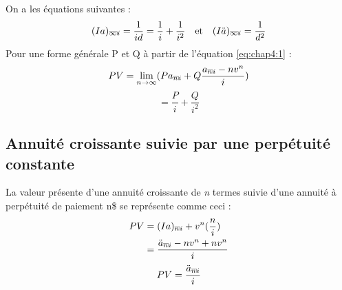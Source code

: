 \documentclass[11pt,french]{report}
\makeatletter
\DeclareRobustCommand{\annuity}[1]{%
\def\arraystretch{0}%
\setlength\arraycolsep{.7pt}%
\setlength\arrayrulewidth{.3pt}%
\begin{array}[b]{@{}c|}\hline
\\[\arraycolsep]%
\scriptstyle #1%
\end{array}%
}
\makeatother
\begin{document}
On a les équations suivantes :
\begin{equation}
(Ia)_{\annuity{\infty}i} = \frac{1}{id} = \frac{1}{i} + \frac{1}{i^2} \quad \text{et} \quad (I\ddot{a})_{\annuity{\infty}i} = \frac{1}{d^2}
\end{equation}
Pour une forme générale P et Q à partir de l'équation \ref{eq:chap4:1} :
\begin{align*}
PV = \lim\limits_{n \to \infty}( Pa_{\annuity{n}i} + Q \frac{a_{\annuity{n}i} - nv^{n}}{i})
\end{align*}
\begin{equation}
= \frac{P}{i} + \frac{Q}{i^2}
\end{equation}
\subsection{Annuité croissante suivie par une perpétuité constante}

La valeur présente d'une annuité croissante de \textit{n} termes suivie d'une annuité à perpétuité de paiement n\$ se représente comme ceci :
\begin{align*}
PV & = (Ia)_{\annuity{n}i} + v^{n}(\frac{n}{i}) \\
 & = \frac{\ddot{a}_{\annuity{n}i} - nv^{n} + nv^{n}}{i}
\end{align*}
\begin{equation}
PV = \frac{\ddot{a}_{\annuity{n}i}}{i}
\end{equation}
\end{document}
